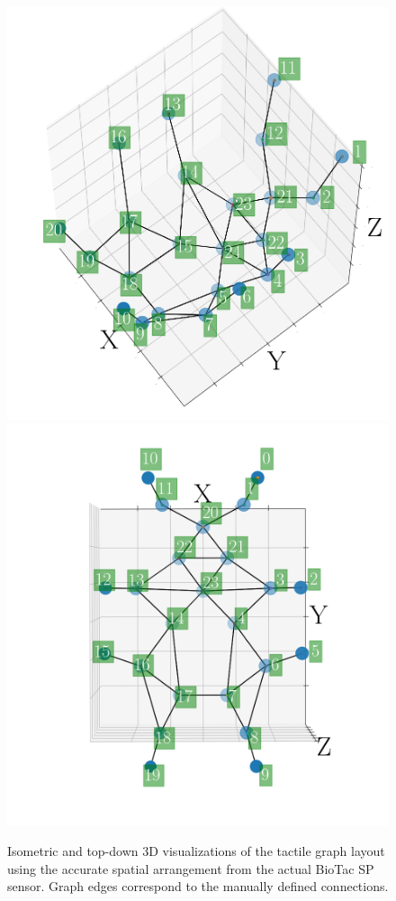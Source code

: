 \begin{figure}[!htb]
	\centering
    \includegraphics[width=0.35\linewidth]{Figures/Tactile/plot3d.png}
    \includegraphics[width=0.35\linewidth]{Figures/Tactile/3dgraphtop.png}
	\caption{Isometric and top-down 3D visualizations of the tactile graph layout using the accurate spatial arrangement from the actual BioTac SP sensor. Graph edges correspond to the manually defined connections.}
	\label{fig:graph_3d}
\end{figure}

\clearpage


